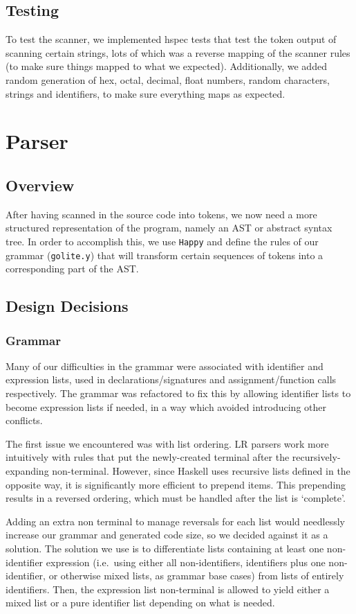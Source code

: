 \documentclass[11pt]{article}
\begin{document}
\subsection{Testing}
To test the scanner, we implemented hspec tests that test the token
output of scanning certain strings, lots of which was a reverse
mapping of the scanner rules (to make sure things mapped to what we
expected). Additionally, we added random generation of hex, octal,
decimal, float numbers, random characters, strings and identifiers, to
make sure everything maps as expected.
\section{Parser}
\subsection{Overview}
After having scanned in the source code into tokens, we now need a
more structured representation of the program, namely an AST or
abstract syntax tree. In order to accomplish this, we use
\texttt{Happy}\cite{github:happy} and define the rules of our grammar
(\texttt{golite.y}) that will transform certain sequences of tokens
into a corresponding part of the AST.
\subsection{Design Decisions}
\subsubsection{Grammar}
Many of our difficulties in the grammar were associated with
identifier and expression lists, used in declarations/signatures and
assignment/function calls respectively. The grammar was refactored to
fix this by allowing identifier lists to become expression lists if
needed, in a way which avoided introducing other conflicts.

The first issue we encountered was with list ordering. LR parsers work
more intuitively with rules that put the newly-created terminal after
the recursively-expanding non-terminal. However, since Haskell uses
recursive lists defined in the opposite way, it is significantly more
efficient to prepend items. This prepending results in a reversed
ordering, which must be handled after the list is `complete'.

Adding an extra non terminal to manage reversals for each list would
needlessly increase our grammar and generated code size, so we decided
against it as a solution. The solution we use is to differentiate
lists containing at least one non-identifier expression (i.e.\ using
either all non-identifiers, identifiers plus one non-identifier, or
otherwise mixed lists, as grammar base cases) from lists of entirely
identifiers. Then, the expression list non-terminal is allowed to
yield either a mixed list or a pure identifier list depending on what
is needed.
\end{document}
